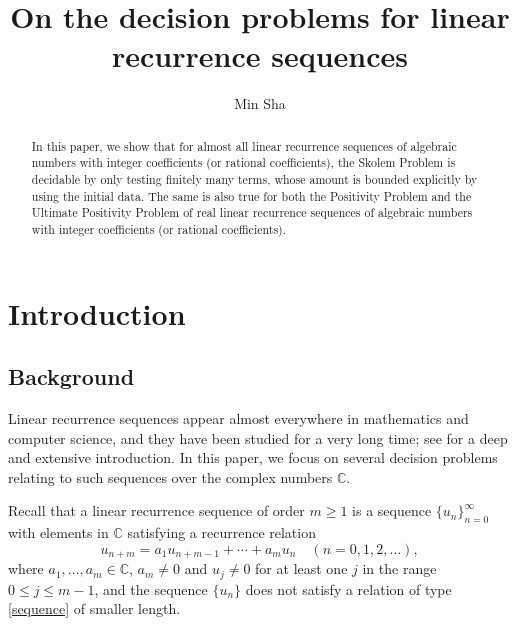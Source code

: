 \documentclass[12pt]{amsart}
\theoremstyle{definition}
\theoremstyle{remark}
\numberwithin{equation}{section}
\begin{document}
\title[]{On the decision problems for linear recurrence sequences}

\author{Min Sha}
\address{School of Mathematics and Statistics, University of New South Wales, Sydney, NSW 2052, Australia}



\begin{abstract}
In this paper, we show that for almost all linear recurrence sequences of algebraic numbers with integer coefficients (or rational coefficients), the Skolem Problem is decidable by only testing finitely many terms, whose amount is bounded explicitly by using the initial data. The same is also true for both the Positivity Problem and the Ultimate Positivity Problem of real linear recurrence sequences of algebraic numbers with integer coefficients (or rational coefficients).
\end{abstract}

\maketitle

\section{Introduction}

\subsection{Background}

Linear recurrence sequences appear almost everywhere in mathematics and computer science, and they have been studied for a very long time; see \cite{EPSW} for a deep and extensive introduction.
In this paper, we focus on several decision problems relating to such sequences over the complex numbers ${{\mathbb C}}$.

Recall that a linear recurrence sequence of order $m\ge 1$ is a sequence $\{u_n\}_{n= 0}^{\infty}$ with elements in ${{\mathbb C}}$ satisfying a recurrence relation
\begin{equation}
\label{sequence}
u_{n+m}=a_1u_{n+m-1}+\cdots+a_mu_n \quad (n=0,1,2,\ldots),
\end{equation}
where $a_1,\dots,a_m\in {{\mathbb C}}$, $a_m\ne 0$ and $u_j \ne 0$ for at least one
 $j$ in the range $0 \le j \le m-1$, and the sequence $\{u_n\}$ does not satisfy a relation of type \eqref{sequence} of smaller length.
\end{document}
